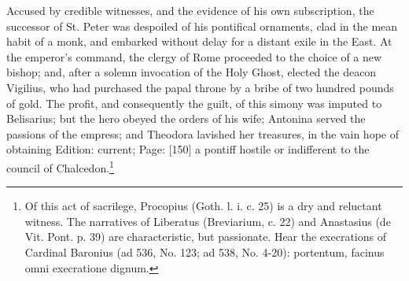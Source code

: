 Accused by credible witnesses, and the evidence of his own subscription, the successor of St. Peter was despoiled of his pontifical ornaments, clad in the mean habit of a monk, and embarked without delay for a distant exile in the East. At the emperor\texthebrew{}’s command, the clergy of Rome proceeded to the choice of a new bishop; and, after a solemn invocation of the Holy Ghost, elected the deacon Vigilius, who had purchased the papal throne by a bribe of two hundred pounds of gold. The profit, and consequently the guilt, of this simony was imputed to Belisarius; but the hero obeyed the orders of his wife; Antonina served the passions of the empress; and Theodora lavished her treasures, in the vain hope of obtaining Edition: current; Page: [150] a pontiff hostile or indifferent to the council of Chalcedon.\footnote{Of this act of sacrilege, Procopius (Goth. l. i. c. 25) is a dry and reluctant witness. The narratives of Liberatus (Breviarium, c. 22) and Anastasius (de Vit. Pont. p. 39) are characteristic, but passionate. Hear the execrations of Cardinal Baronius (ad 536, No. 123; ad 538, No. 4-20): portentum, facinus omni execratione dignum.}

